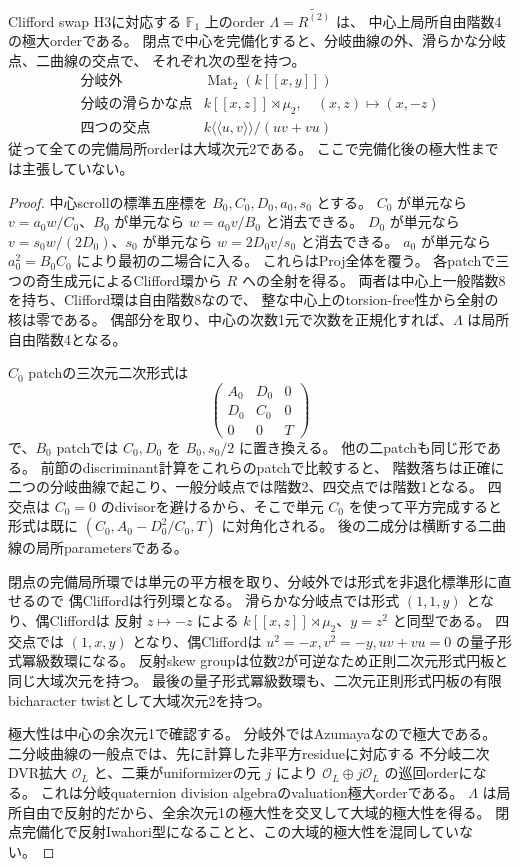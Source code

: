 \begin{theorem}
\label{thm:normal-order2-maximal-local-models}
Clifford swap H3に対応する $\mathbb F_1$ 上のorder $\Lambda=\widetilde{R^{(2)}}$ は、
中心上局所自由階数4の極大orderである。
閉点で中心を完備化すると、分岐曲線の外、滑らかな分岐点、二曲線の交点で、
それぞれ次の型を持つ。
\[
\begin{array}{c|l}
 \text{分岐外}&\operatorname{Mat}_2(k[[x,y]])\\
 \text{分岐の滑らかな点}&k[[x,z]]\rtimes\mu_2,
       \quad (x,z)\mapsto(x,-z)\\
 \text{四つの交点}&k\langle\!\langle u,v\rangle\!\rangle/(uv+vu)
\end{array}
\]
従って全ての完備局所orderは大域次元2である。
ここで完備化後の極大性までは主張していない。
\end{theorem}
\begin{proof}
中心scrollの標準五座標を $B_0,C_0,D_0,a_0,s_0$ とする。
$C_0$ が単元なら $v=a_0w/C_0$、$B_0$ が単元なら $w=a_0v/B_0$ と消去できる。
$D_0$ が単元なら $v=s_0w/(2D_0)$、$s_0$ が単元なら $w=2D_0v/s_0$ と消去できる。
$a_0$ が単元なら $a_0^2=B_0C_0$ により最初の二場合に入る。
これらはProj全体を覆う。
各patchで三つの奇生成元によるClifford環から $R$ への全射を得る。
両者は中心上一般階数8を持ち、Clifford環は自由階数8なので、
整な中心上のtorsion-free性から全射の核は零である。
偶部分を取り、中心の次数1元で次数を正規化すれば、$\Lambda$ は局所自由階数4となる。

$C_0$ patchの三次元二次形式は
\[
 \begin{pmatrix}A_0&D_0&0\\D_0&C_0&0\\0&0&T\end{pmatrix}
\]
で、$B_0$ patchでは $C_0,D_0$ を $B_0,s_0/2$ に置き換える。
他の二patchも同じ形である。
前節のdiscriminant計算をこれらのpatchで比較すると、
階数落ちは正確に二つの分岐曲線で起こり、一般分岐点では階数2、四交点では階数1となる。
四交点は $C_0=0$ のdivisorを避けるから、そこで単元 $C_0$ を使って平方完成すると
形式は既に $(C_0,A_0-D_0^2/C_0,T)$ に対角化される。
後の二成分は横断する二曲線の局所parametersである。

閉点の完備局所環では単元の平方根を取り、分岐外では形式を非退化標準形に直せるので
偶Cliffordは行列環となる。
滑らかな分岐点では形式 $(1,1,y)$ となり、偶Cliffordは
反射 $z\mapsto-z$ による $k[[x,z]]\rtimes\mu_2$、$y=z^2$ と同型である。
四交点では $(1,x,y)$ となり、偶Cliffordは
$u^2=-x,v^2=-y,uv+vu=0$ の量子形式冪級数環になる。
反射skew groupは位数2が可逆なため正則二次元形式円板と同じ大域次元を持つ。
最後の量子形式冪級数環も、二次元正則形式円板の有限bicharacter twistとして大域次元2を持つ。

極大性は中心の余次元1で確認する。
分岐外ではAzumayaなので極大である。
二分岐曲線の一般点では、先に計算した非平方residueに対応する
不分岐二次DVR拡大 $\mathcal O_L$ と、二乗がuniformizerの元 $j$ により
$\mathcal O_L\oplus j\mathcal O_L$ の巡回orderになる。
これは分岐quaternion division algebraのvaluation極大orderである。
$\Lambda$ は局所自由で反射的だから、全余次元1の極大性を交叉して大域的極大性を得る。
閉点完備化で反射Iwahori型になることと、この大域的極大性を混同していない。
\end{proof}

